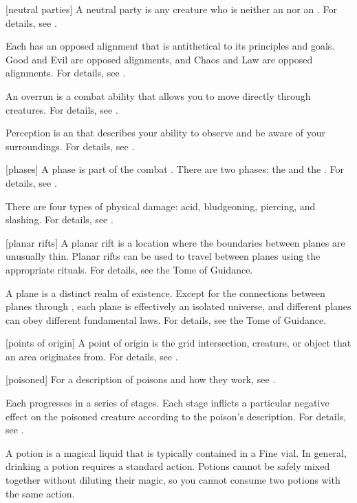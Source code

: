 [neutral parties] A neutral party is any creature who is neither an  nor an .
For details, see .

 Each  has an opposed alignment that is antithetical to its principles and goals.
Good and Evil are opposed alignments, and Chaos and Law are opposed alignments.
For details, see .

 An overrun is a combat ability that allows you to move directly through creatures.
For details, see .

 Perception is an  that describes your ability to observe and be aware of your surroundings.
For details, see .

[phases] A phase is part of the combat .
There are two phases: the  and the .
For details, see .

 There are four types of physical damage: acid, bludgeoning, piercing, and slashing.
For details, see .

[planar rifts] A planar rift is a location where the boundaries between planes are unusually thin.
Planar rifts can be used to travel between planes using the appropriate rituals.
For details, see the Tome of Guidance.

 A plane is a distinct realm of existence.
Except for the connections between planes through , each plane is effectively an isolated universe, and different planes can obey different fundamental laws.
For details, see the Tome of Guidance.

[points of origin] A point of origin is the grid intersection, creature, or object that an area originates from.
For details, see .

[poisoned] For a description of poisons and how they work, see .

 Each  progresses in a series of stages.
Each stage inflicts a particular negative effect on the poisoned creature according to the poison's description.
For details, see .

 A potion is a magical liquid that is typically contained in a Fine vial.
In general, drinking a potion requires a standard action.
Potions cannot be safely mixed together without diluting their magic, so you cannot consume two potions with the same action.

